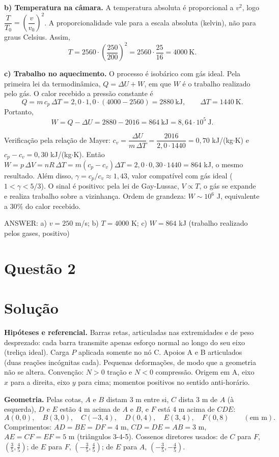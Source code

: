 \documentclass{article}%
\begin{document}
\textbf{b) Temperatura na câmara.} A temperatura absoluta é proporcional a $v^2$, logo $\dfrac{T}{T_0} = \left(\dfrac{v}{v_0}\right)^2$. A proporcionalidade vale para a escala absoluta (kelvin), não para graus Celsius. Assim,
\[
T = 2560\cdot\left(\frac{250}{200}\right)^2 = 2560\cdot\frac{25}{16} = 4000\ \text{K}.
\]

\textbf{c) Trabalho no aquecimento.} O processo é isobárico com gás ideal. Pela primeira lei da termodinâmica, $Q = \Delta U + W$, em que $W$ é o trabalho realizado pelo gás. O calor recebido a pressão constante é
\[
Q = m\,c_p\,\Delta T = 2{,}0\cdot 1{,}0\cdot(4000 - 2560) = 2880\ \text{kJ}, \qquad \Delta T = 1440\ \text{K}.
\]
Portanto,
\[
W = Q - \Delta U = 2880 - 2016 = 864\ \text{kJ} = 8{,}64\cdot 10^{5}\ \text{J}.
\]

Verificação pela relação de Mayer: $c_v = \dfrac{\Delta U}{m\,\Delta T} = \dfrac{2016}{2{,}0\cdot 1440} = 0{,}70$ kJ/(kg$\cdot$K) e $c_p - c_v = 0{,}30$ kJ/(kg$\cdot$K). Então $W = p\,\Delta V = nR\,\Delta T = m(c_p - c_v)\Delta T = 2{,}0\cdot 0{,}30\cdot 1440 = 864$ kJ, o mesmo resultado. Além disso, $\gamma = c_p/c_v \approx 1{,}43$, valor compatível com gás ideal ($1 < \gamma < 5/3$). O sinal é positivo: pela lei de Gay-Lussac, $V \propto T$, o gás se expande e realiza trabalho sobre a vizinhança. Ordem de grandeza: $W \sim 10^6$ J, equivalente a $30\%$ do calor recebido.

ANSWER: a) $v = 250$ m/s; b) $T = 4000$ K; c) $W = 864$ kJ (trabalho realizado pelos gases, positivo)%
\newpage%
\section*{Questão 2}

\section*{Solução}

\textbf{Hipóteses e referencial.} Barras retas, articuladas nas extremidades e de peso desprezado: cada barra transmite apenas esforço normal ao longo do seu eixo (treliça ideal). Carga $P$ aplicada somente no nó C. Apoios A e B articulados (duas reações incógnitas cada). Pequenas deformações, de modo que a geometria não se altera. Convenção: $N>0$ tração e $N<0$ compressão. Origem em A, eixo $x$ para a direita, eixo $y$ para cima; momentos positivos no sentido anti-horário.

\textbf{Geometria.} Pelas cotas, $A$ e $B$ distam 3 m entre si, $C$ dista 3 m de $A$ (à esquerda), $D$ e $E$ estão 4 m acima de $A$ e $B$, e $F$ está 4 m acima de $CDE$:
\[
A(0,0),\quad B(3,0),\quad C(-3,4),\quad D(0,4),\quad E(3,4),\quad F(0,8)\qquad(\text{em m}).
\]
Comprimentos: $AD=BE=DF=4$ m, $CD=DE=AB=3$ m, $AE=CF=EF=5$ m (triângulos 3-4-5). Cossenos diretores usados: de $C$ para $F$, $\left(\tfrac35,\tfrac45\right)$; de $E$ para $F$, $\left(-\tfrac35,\tfrac45\right)$; de $E$ para $A$, $\left(-\tfrac35,-\tfrac45\right)$.
\end{document}
